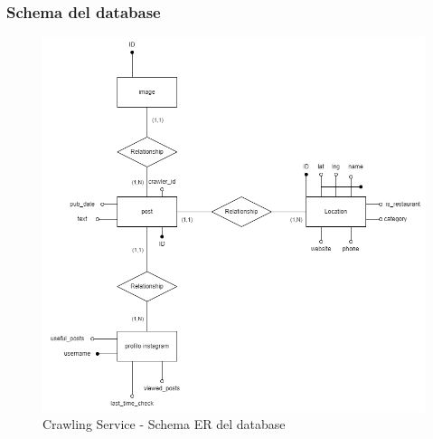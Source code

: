 \subsubsection{Schema del database}
\begin{figure}[h]
    \centering
    \includegraphics[scale=0.35]{Contenuto/Immagini/ER-CS.png}
    \caption{Crawling Service - Schema ER del database}
\end{figure}